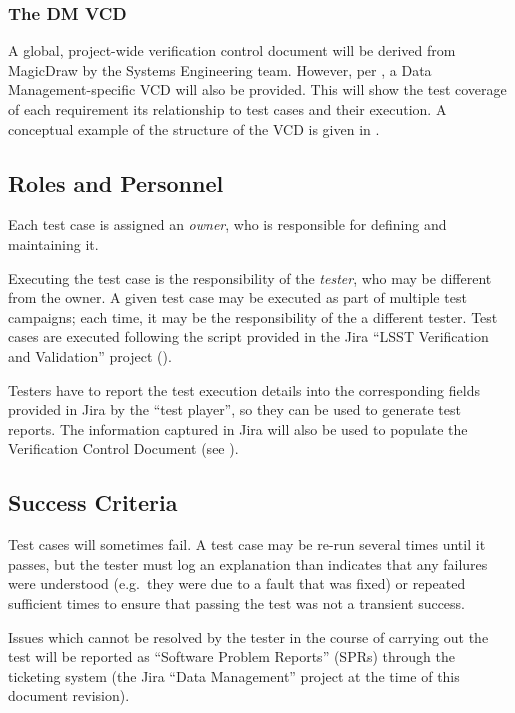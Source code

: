 \subsubsection{The DM VCD}

A global, project-wide verification control document will be derived from MagicDraw by the Systems Engineering team.
However, per , a Data Management-specific VCD will also be provided.
This will show the test coverage of each requirement its relationship to test cases and their execution.
A conceptual example of the structure of the VCD is given in .



\subsection{Roles and Personnel}
\label{sect:roles}

Each test case is assigned an \emph{owner}, who is responsible for defining and maintaining it.

Executing the test case is the responsibility of the \emph{tester}, who may be different from the owner.
A given test case may be executed as part of multiple test campaigns; each time, it may be the responsibility of the a different tester.
Test cases are executed following the script provided in the Jira ``LSST Verification and Validation'' project ().

Testers have to report the test execution details into the corresponding fields provided in Jira by the ``test player'',  so they can be used to generate test reports.
The information captured in Jira will also be used to populate the Verification Control Document (see ).

\subsection{Success Criteria}

Test cases will sometimes fail.
A test case may be re-run several times until it passes, but the tester must log an explanation than indicates that any failures were understood (e.g.\ they were due to a fault that was fixed) or repeated sufficient times to ensure that passing the test was not a transient success.

Issues which cannot be resolved by the tester in the course of carrying out the test will be reported as ``Software Problem Reports'' (SPRs) through the \product{} ticketing system (the Jira ``Data Management'' project at the time of this document revision).

